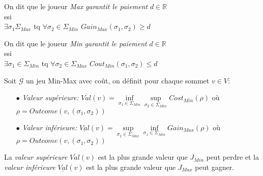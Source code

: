 \begin{defi}$\text{}$\\
	
	\begin{center}On dit que le joueur \textit{Max} \textit{garantit le paiement} $d \in \mathbb{R}$\\ 
		ssi \\ 
	$\exists \sigma _{1}\Sigma _{Max}$ tq $\forall \sigma _{2} \in \Sigma _{Min}$ $ Gain_{Max}(\sigma _{1},\sigma _{2}) \geq d$\\\end{center}
	
	\begin{center} 
		On dit que le joueur \textit{Min} \textit{garantit le paiement} $d \in \mathbb{R}$\\		
		ssi	\\
		$\exists \sigma _{1}\in \Sigma _{Min}$ tq $\forall \sigma _{2} \in \Sigma _{Max}$ $ Cout_{Min}(\sigma _{1},\sigma _{2}) \leq d$\\
		\end{center}

\end{defi}
		


\begin{defi}
	
	Soit $\mathcal{G}$ un jeu Min-Max avec coût, on définit pour chaque sommet $v \in V$: 
	\begin{enumerate}
		\item[$\bullet$]\textit{Valeur supérieure:} $\overline{Val}(v) = \inf\limits_{\sigma _{1} \in \Sigma _{Min}} \sup\limits_{\sigma _{2} \in \Sigma_{Max}} Cost_{Min}(\rho)$ où $\rho = Outcome(v,(\sigma _{1},\sigma _{2}))$
		
		\item[$\bullet$]\textit{Valeur inférieure:} $\underline{Val}(v) = \sup\limits_{\sigma _{2} \in \Sigma_{Max}}  \inf\limits_{\sigma _{1} \in \Sigma _{Min}} Gain_{Max}(\rho)$  où $\rho = Outcome(v,(\sigma _{1},\sigma _{2}))$
	\end{enumerate}
\end{defi}
\begin{rem}
	La \textit{valeur supérieure}  $\overline{Val}(v)$ est la plus grande valeur que $J_{Min}$ peut perdre et la \textit{valeur inférieure} $\underline{Val}(v) $ est la plus grande valeur que $J_{Max}$ peut gagner.
\end{rem}

